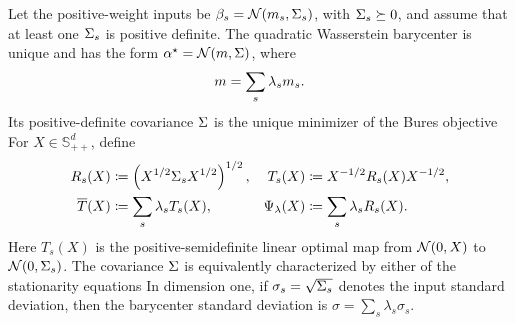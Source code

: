 \begin{prop}\label{prop-gaussian-barycenter}
	Let the positive-weight inputs be $\beta_s=\mathcal{N}(m_s,\Sigma_s)$, with $\Sigma_s\succeq0$, and assume that at least one $\Sigma_s$ is positive definite. The quadratic Wasserstein barycenter is unique and has the form $\alpha^\star=\mathcal{N}(m,\Sigma)$, where
	\[
		m=\sum_s\lambda_sm_s.
	\]
	Its positive-definite covariance $\Sigma$ is the unique minimizer of the Bures objective
	For $X\in\mathbb S_{++}^d$, define
	\begin{align}
		R_s(X)
		&\coloneqq
		\left( X^{1/2}\Sigma_sX^{1/2} \right)^{1/2},
		&
		T_s(X)
		&\coloneqq
		X^{-1/2}R_s(X)X^{-1/2},
		\label{eq-gaussian-barycenter-maps}
		\\
		\overline T(X)
		&\coloneqq
		\sum_s\lambda_sT_s(X),
		&
		\Psi_{\lambda}(X)
		&\coloneqq
		\sum_s\lambda_sR_s(X).
		\label{eq-gaussian-barycenter-average-map}
	\end{align}
	Here $T_s(X)$ is the positive-semidefinite linear optimal map from $\mathcal{N}(0,X)$ to $\mathcal{N}(0,\Sigma_s)$. The covariance $\Sigma$ is equivalently characterized by either of the stationarity equations
	In dimension one, if $\sigma_s=\sqrt{\Sigma_s}$ denotes the input standard deviation, then the barycenter standard deviation is $\sigma=\sum_s\lambda_s\sigma_s$.
\end{prop}

